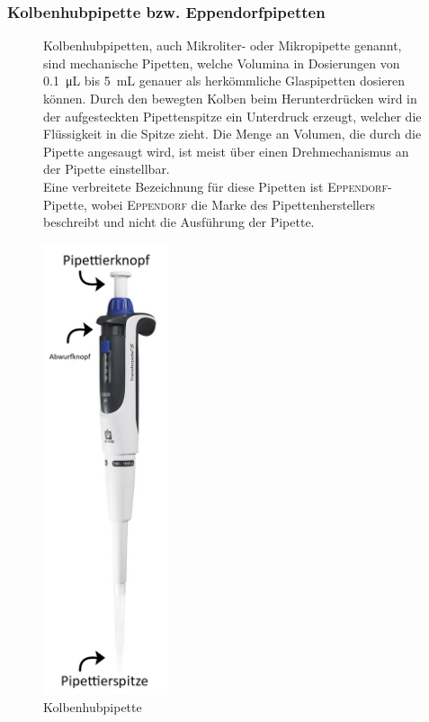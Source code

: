\subsubsection*{Kolbenhubpipette bzw. Eppendorfpipetten}
\begin{figure}[h!]
	\begin{minipage}[t]{0.63\textwidth}
		\vspace{0pt}
		Kolbenhubpipetten, auch Mikroliter- oder Mikropipette genannt, sind mechanische Pipetten, welche Volumina in Dosierungen von \SI{0,1}{\micro \liter} bis \SI{5}{\milli \liter}  genauer als herkömmliche Glaspipetten dosieren können. Durch den bewegten Kolben beim Herunterdrücken wird in der aufgesteckten Pipettenspitze ein Unterdruck erzeugt, welcher die Flüssigkeit in die Spitze zieht. Die Menge an Volumen, die durch die Pipette angesaugt wird, ist meist über einen Drehmechanismus an der Pipette einstellbar.\\
		Eine verbreitete Bezeichnung für diese Pipetten ist \mbox{\textsc{Eppendorf}}-Pipette, wobei \textsc{Eppendorf} die Marke des Pipettenherstellers beschreibt und nicht die Ausführung der Pipette.
	\end{minipage}
	\hfill
	\begin{minipage}[t]{0.35\textwidth}
		\vspace{0pt}
		\centering
		\includegraphics[width=0.33\textwidth]{img/eppendorf}
		\caption{Kolbenhubpipette}
		\label{fig:eppen}
	\end{minipage}
\end{figure}
\FloatBarrier

